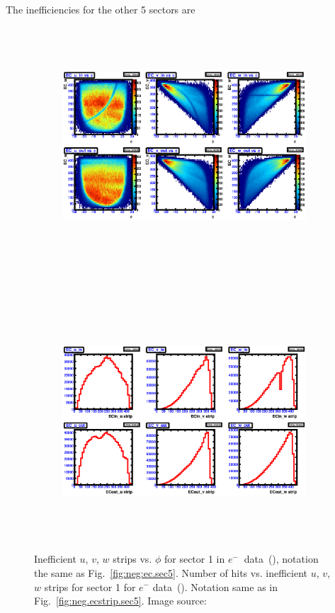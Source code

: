 \FloatBarrier
The inefficiencies for the other 5 sectors are
\begin{figure}[!ht]
  \centering
  \begin{subfigure}[b]{\figwidth}
  \includegraphics[width=\figwidth, height=3.5in,valign=c]{figures/calib/ec/pim_ecuvw_phi_NOKnockout_sec1.eps}\caption{}\label{fig:EC_I_I}
  \end{subfigure}%
  \\
  \begin{subfigure}[b]{\figwidth}
  \includegraphics[width=\figwidth, height=3.5in,valign=c]{figures/calib/ec/pim_ecuvw_NOKnockout_sec1.eps}\caption{}\label{fig:EC_II_I}
  \end{subfigure}%
      \caption {Inefficient  $u$, $v$, $w$ strips vs. $\phi$ for sector 1 in  $e^{-} \ $ data~(), notation the same as Fig.~\ref{fig:neg:ec.sec5}. Number of hits vs. inefficient  $u$, $v$, $w$ strips for sector 1 for $e^-$ data~(). Notation same as in Fig.~\ref{fig:neg.ecstrip.sec5}. Image source:~\cite{clas.thesis.kunkel}}
        \label{fig:EC_no_I}
\end{figure}



